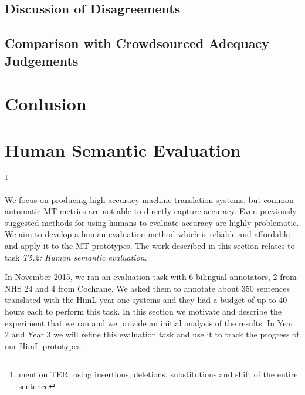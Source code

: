 \documentclass[11pt]{article}
\newcommand{\oa}[1]{\footnote{\color{red} #1}}
\begin{document}
\subsection{Discussion of Disagreements}\label{sec:disagreements}


\subsection{Comparison with Crowdsourced Adequacy Judgements}\label{sec:adequacy}



\section{Conlusion}\label{sec:conclusion}










\section{Human Semantic Evaluation}

\oa{mention TER: using insertions, deletions, substitutions and shift of the entire sentence}

\label{sec:sem-eval:human}
We focus on producing high accuracy machine translation systems, but common 
automatic MT metrics are not able to directly capture accuracy. Even previously suggested methods
for using humans to evaluate accuracy are highly problematic. We aim to  develop a human evaluation method 
which is reliable and affordable and apply it to the MT prototypes. 
The
work described
in this section relates to 
task
\emph{T5.2: Human semantic evaluation}.


In November 2015, we ran an evaluation task with 6 bilingual annotators, 2 from NHS 24 and 4 from Cochrane. 
We asked them to annotate about 350 sentences translated with the HimL year one systems 
and they had a budget of  up  to 40 hours each to perform this task. 
In this section we motivate and describe the experiment that we ran and we provide an initial analysis of
the results. In  Year 2 and Year 3 we will refine this evaluation task and use it to track the progress of our HimL prototypes.
\end{document}

